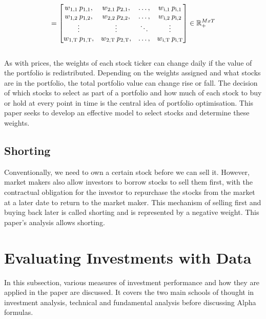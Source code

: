 \documentclass[a4paper,12pt]{report}
\numberwithin{equation}{section}
\theoremstyle{definition}
\begin{document}
\begin{equation*}
= 
  \begin{bmatrix}
    w\textsubscript{1,1}\:p\textsubscript{1,1},&
    w\textsubscript{2,1}\:p\textsubscript{2,1},&
    \ldots,&
    w\textsubscript{i,1}\:p\textsubscript{i,1} 
    \\
    w\textsubscript{1,2}\:p\textsubscript{1,2},&
    w\textsubscript{2,2}\:p\textsubscript{2,2},&
    \ldots,&
    w\textsubscript{i,2}\:p\textsubscript{i,2}
    \\
    \vdots&\vdots&\ddots&\vdots
    \\
    w\textsubscript{1,T}\:p\textsubscript{1,T},&
    w\textsubscript{2,T}\:p\textsubscript{2,T},&
    \ldots,&
    w\textsubscript{i,T}\:p\textsubscript{i,T}
  \end{bmatrix}
  \in \mathbb{R}_+^{M x T}
\end{equation*}
\\
As with prices, the weights of each stock ticker can change daily if the value of the portfolio is redistributed. Depending on the weights assigned and what stocks are in the portfolio, the total portfolio value can change rise or fall. The decision of which stocks to select as part of a portfolio and how much of each stock to buy or hold at every point in time is the central idea of portfolio optimisation. This paper seeks to develop an effective model to select stocks and determine these weights.

\subsection{Shorting}
Conventionally, we need to own a certain stock before we can sell it. However, market makers also allow investors to borrow stocks to sell them first, with the contractual obligation for the investor to repurchase the stocks from the market at a later date to return to the market maker. This mechanism of selling first and buying back later is called shorting and is represented by a negative weight. This paper's analysis allows shorting.



\section{Evaluating Investments with Data}
In this subsection, various measures of investment performance and how they are applied in the paper are discussed. It covers the two main schools of thought in investment analysis, technical and fundamental analysis before discussing Alpha formulas.
\end{document}
